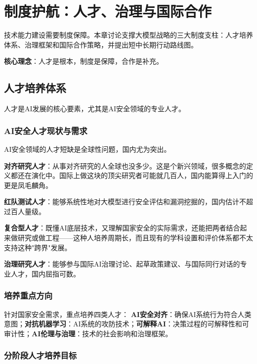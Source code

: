 \chapter{制度护航：人才、治理与国际合作}

技术能力建设需要制度保障。本章讨论支撑大模型战略的三大制度支柱：人才培养体系、治理框架和国际合作策略，并提出短中长期行动路线图。

\textbf{核心理念}：人才是根本，制度是保障，合作是补充。

\section{人才培养体系}

人才是AI发展的核心要素，尤其是AI安全领域的专业人才。

\subsection{AI安全人才现状与需求}

AI安全领域的人才短缺是全球性问题，国内尤为突出。

\textbf{对齐研究人才}：从事对齐研究的人全球也没多少。这是个新兴领域，很多概念的定义都还在演化中。国际上做这块的顶尖研究者可能就几百人，国内能算得上入门的更是凤毛麟角。

\textbf{红队测试人才}：能够系统性地对大模型进行安全评估和漏洞挖掘的，国内估计不超过百人量级。

\textbf{复合型人才}：既懂AI底层技术，又理解国家安全的实际需求，还能把两者结合起来做研究或做工程——这种人培养周期长，而且现有的学科设置和评价体系都不太支持这种"跨界"发展。

\textbf{治理研究人才}：能够参与国际AI治理讨论、起草政策建议、与国际同行对话的专业人才，国内屈指可数。

\subsection{培养重点方向}

针对国家安全需求，重点培养四类人才：
\textbf{AI安全对齐}：确保AI系统行为符合人类意图；\textbf{对抗机器学习}：AI系统的攻防技术；\textbf{可解释AI}：决策过程的可解释性和可审计性；\textbf{AI伦理与治理}：技术的社会影响和治理框架。

\subsection{分阶段人才培养目标}

